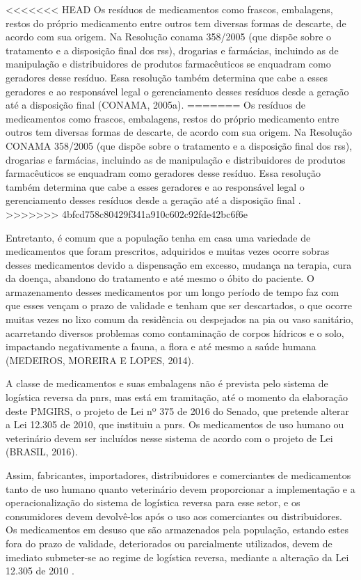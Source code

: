 \begin{description}
<<<<<<< HEAD
	Os resíduos de medicamentos como frascos, embalagens, restos do próprio medicamento entre outros tem diversas formas de descarte, de acordo com sua origem. Na Resolução \gls{conama} 358/2005 (que dispõe sobre o tratamento e a disposição final dos \gls{rss}), drogarias e farmácias, incluindo as de manipulação e distribuidores de produtos farmacêuticos se enquadram como geradores desse resíduo. Essa resolução também determina que cabe a esses geradores e ao responsável legal o gerenciamento desses resíduos desde a geração até a disposição final (CONAMA, 2005a).
=======
	Os resíduos de medicamentos como frascos, embalagens, restos do próprio medicamento entre outros tem diversas formas de descarte, de acordo com sua origem. Na Resolução CONAMA 358/2005 (que dispõe sobre o tratamento e a disposição final dos \gls{rss}), drogarias e farmácias, incluindo as de manipulação e distribuidores de produtos farmacêuticos se enquadram como geradores desse resíduo. Essa resolução também determina que cabe a esses geradores e ao responsável legal o gerenciamento desses resíduos desde a geração até a disposição final \cite{conama:358}.
>>>>>>> 4bfcd758c80429f341a910c602c92fde42bc6f6e
	
	Entretanto, é comum que a população tenha em casa uma variedade de medicamentos que foram prescritos, adquiridos e muitas vezes ocorre sobras desses medicamentos devido a dispensação em excesso, mudança na terapia, cura da doença, abandono do tratamento e até mesmo o óbito do paciente. O armazenamento desses medicamentos por um longo período de tempo faz com que esses vençam o prazo de validade e tenham que ser descartados, o que ocorre muitas vezes no lixo comum da residência ou despejados na pia ou vaso sanitário, acarretando diversos problemas como contaminação de corpos hídricos e o solo, impactando negativamente a fauna, a flora e até mesmo a saúde humana (MEDEIROS, MOREIRA E LOPES, 2014).
	
	A classe de medicamentos e suas embalagens não é prevista pelo sistema de logística reversa da \gls{pnrs}, mas está em tramitação, até o momento da elaboração deste PMGIRS, o projeto de Lei nº 375 de 2016 do Senado, que pretende alterar a Lei 12.305 de 2010, que instituiu a \gls{pnrs}. Os medicamentos de uso humano ou veterinário devem ser incluídos nesse sistema de acordo com o projeto de Lei (BRASIL, 2016).
	
	Assim, fabricantes, importadores, distribuidores e comerciantes de medicamentos tanto de uso humano quanto veterinário devem proporcionar a implementação e a operacionalização do sistema de logística reversa para esse setor, e os consumidores devem devolvê-los após o uso aos comerciantes ou distribuidores. Os medicamentos em desuso que são armazenados pela população, estando estes fora do prazo de validade, deteriorados ou parcialmente utilizados, devem de imediato submeter-se ao regime de logística reversa, mediante a alteração da Lei 12.305 de 2010 \cite{brasil:12305}.
	

\end{description}
